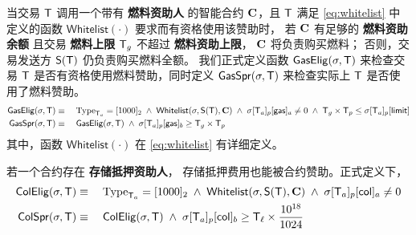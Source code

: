 当交易 $\textsf{T}$ 调用一个带有 \textbf{燃料资助人} 的智能合约 $\mathbf{C}$，且 $\textsf{T}$ 满足 \cref{eq:whitelist} 中定义的函数 $\mathsf{Whitelist}(\cdot)$ 要求而有资格使用该赞助时，
若 $\mathbf{C}$ 有足够的 \textbf{燃料资助余额} 且交易 \textbf{燃料上限} $\textsf{T}_g$ 不超过 {\bf 燃料资助上限}，
$\mathbf{C}$ 将负责购买燃料；
否则，交易发送方 $\mathsf{S}{\left({\textsf{T}} \right)}$ 仍负责购买燃料全额。
我们正式定义函数 $\mathsf{GasElig}(\mathbf{\sigma},\textsf{T})$ 来检查交易 $\textsf{T}$ 是否有资格使用燃料赞助，同时定义 $\mathsf{GasSpr}(\mathbf{\sigma},\textsf{T})$ 来检查实际上 $\textsf{T}$ 是否使用了燃料赞助。
\begin{align}
\mathsf{GasElig}(\mathbf{\sigma},\textsf{T})&\equiv \quad \mathrm{Type}_{\textsf{T}_a}=[1000]_2 \;\wedge\; \mathsf{Whitelist}(\mathbf{\sigma},\mathsf{S}{\left({\textsf{T}} \right)},\mathbf{C}) \;\wedge\; \mathbf{\sigma}[\textsf{T}_a]_p[\mathsf{gas}]_a\neq 0 \;\wedge\; \textsf{T}_g\times\textsf{T}_p \le \mathbf{\sigma}[\textsf{T}_a]_p[\mathsf{limit}] \\
\mathsf{GasSpr}(\mathbf{\sigma},\textsf{T}) &\equiv\quad  \mathsf{GasElig}(\mathbf{\sigma},\textsf{T}) \;\wedge\; \mathbf{\sigma}[\textsf{T}_a]_p[{\sf gas}]_b\ge \textsf{T}_g\times\textsf{T}_p
\end{align}
%
其中，函数 $\mathsf{Whitelist}(\cdot)$ 在 \cref{eq:whitelist} 有详细定义。

若一个合约存在 \textbf{存储抵押资助人}， 存储抵押费用也能被合约赞助。正式定义下，
\begin{align}
\mathsf{ColElig}(\mathbf{\sigma},\textsf{T}) &\equiv \quad \mathrm{Type}_{\textsf{T}_a}=[1000]_2 \;\wedge\; \mathsf{Whitelist}(\mathbf{\sigma},\mathsf{S}{\left({\textsf{T}} \right)},\mathbf{C}) \;\wedge\; \mathbf{\sigma}[\textsf{T}_a]_p[\mathsf{col}]_a\neq 0 \\
\mathsf{ColSpr}(\mathbf{\sigma},\textsf{T}) &\equiv\quad  \mathsf{ColElig}(\mathbf{\sigma},\textsf{T}) \;\wedge\; \mathbf{\sigma}[\textsf{T}_a]_p[{\sf col}]_b\ge \textsf{T}_\ell\times \frac{10^{18}}{1024}
\end{align}

